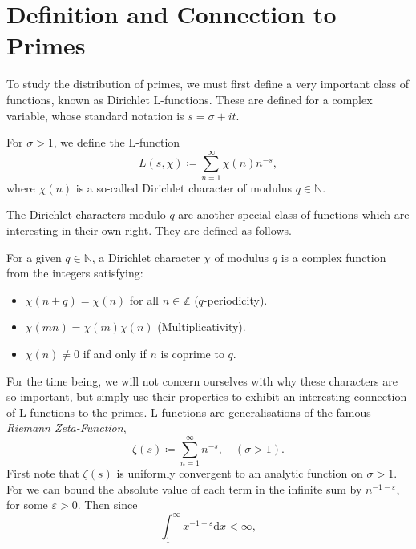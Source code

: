 \section{Definition and Connection to Primes}
To study the distribution of primes, we must first define a very important class of functions, known as Dirichlet L-functions. These are defined for a complex variable, whose standard notation is $s = \sigma + i t$. 
\begin{definition}
\label{LFunctionDefinition}
For $\sigma > 1$, we define the L-function
\begin{equation}
    L(s, \chi) \coloneqq \sum_{n=1}^{\infty} \chi(n) n^{-s}, \nonumber
\end{equation}
where $\chi(n)$ is a so-called Dirichlet character of modulus $q \in \mathbb{N}$.
\end{definition}
The Dirichlet characters modulo $q$ are another special class of functions which are interesting in their own right. They are defined as follows.
\begin{definition}
\label{DirichletCharacterDefinition}
For a given $q \in \mathbb{N}$, a Dirichlet character $\chi$ of modulus $q$ is a complex function from the integers satisfying:
\begin{itemize}
    \item $\chi(n + q) = \chi(n)$ for all $n \in \mathbb{Z}$ ($q$-periodicity).
    \item $\chi(m n) = \chi(m) \chi(n)$ (Multiplicativity).
    \item $\chi(n) \neq 0$ if and only if $n$ is coprime to $q$.
\end{itemize}
\end{definition}
For the time being, we will not concern ourselves with why these characters are so important, but simply use their properties to exhibit an interesting connection of L-functions to the primes. L-functions are generalisations of the famous \textit{Riemann Zeta-Function},
\begin{equation}
    \zeta(s) \coloneqq \sum_{n=1}^{\infty} n^{-s}, \quad (\sigma > 1).
\end{equation}
First note that $\zeta(s)$ is uniformly convergent to an analytic function on $\sigma > 1$. For we can bound the absolute value of each term in the infinite sum by $n^{-1 - \varepsilon}$, for some $\varepsilon > 0$. Then since
\begin{equation}
    \int_{1}^{\infty} x^{-1 - \varepsilon} \mathrm{d}x < \infty, \nonumber 
\end{equation}
